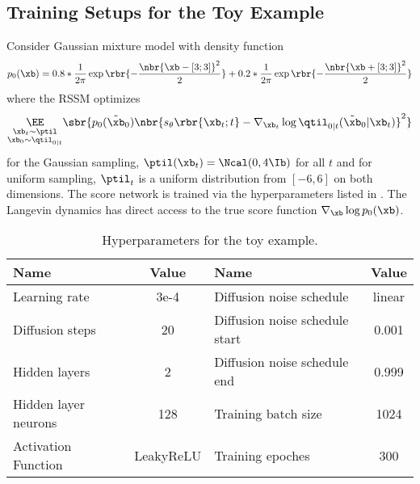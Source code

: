 \subsection{Training Setups for the Toy Example}
\label{sec:apdx_toy_example}
Consider Gaussian mixture model with density function
\begin{equation}
    p_0(\xb) = 0.8 * \frac{1}{2\pi}\exp\rbr{-\frac{\nbr{\xb-[3;3]}^2}{2}} + 0.2 * \frac{1}{2\pi}\exp\rbr{-\frac{\nbr{\xb+[3;3]}^2}{2}}
\end{equation}
where the RSSM optimizes
\begin{equation}
        \underset{\substack{\xb_t\sim \ptil \\\xb_0\sim\qtil_{0|t}}}{\EE}\sbr{p_0(\tilde\xb_0)\nbr{s_\theta\rbr{\xb_t;t} - \nabla_{\xb_t}\log \qtil_{0|t}(\tilde\xb_0|\xb_t)}^2} %
\end{equation}
for the Gaussian sampling, $\ptil(\xb_t)=\Ncal(0, 4\Ib)$ for all $t$ and for uniform sampling, $\ptil_t$ is a uniform distribution from $[-6, 6]$ on both dimensions.
The score network is trained via the hyperparameters listed in . The Langevin dynamics has direct access to the true score function $\nabla_\xb\log p_0(\xb)$.
\begin{table}[h]
    \centering
    \caption{Hyperparameters for the toy example.}
    \vspace{10pt}
    \begin{tabular}{l|c|l|c}
    \toprule
      \textbf{Name}   & \textbf{Value}&\textbf{Name}   & \textbf{Value} \\
      \midrule
      Learning rate & 3e-4 & Diffusion noise schedule & linear\\
      Diffusion steps & 20&Diffusion noise schedule start & 0.001\\
      Hidden layers & 2&Diffusion noise schedule end & 0.999\\
      Hidden layer neurons & 128&Training batch size & 1024\\
      Activation Function & LeakyReLU & Training epoches & 300 \\
         \bottomrule
    \end{tabular}
    \label{tab:hyperpara_toy}
\end{table}

